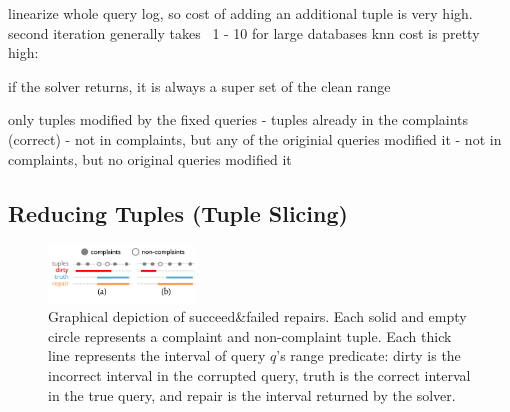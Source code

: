 

linearize whole query log, so cost of adding an additional tuple is very high.
second iteration generally takes ~1 - 10%
for large databases knn cost is pretty high: ~

if the solver returns, it is always a super set of the clean range

only tuples modified by the fixed queries
- tuples already in the complaints (correct)
- not in complaints, but any of the originial queries modified it
- not in complaints, but no original queries modified it
\fi



\subsection{Reducing Tuples (Tuple Slicing)}
\label{sec:opt:tbsize}
\begin{figure}[t]
    \centering
    \includegraphics[width=0.35\textwidth]{figures/2nditerationgroups}
    \vspace*{-.2in}
    \caption{Graphical depiction of succeed\&failed repairs. Each solid and empty circle represents a complaint and non-complaint tuple.
Each thick line represents the interval of query $q$'s range predicate: 
dirty is the incorrect interval in the corrupted query,
truth is the correct interval in the true query, 
and repair is the interval returned by the solver.}
    \label{fig:groups}
    \vspace*{-.2in}
\end{figure}

